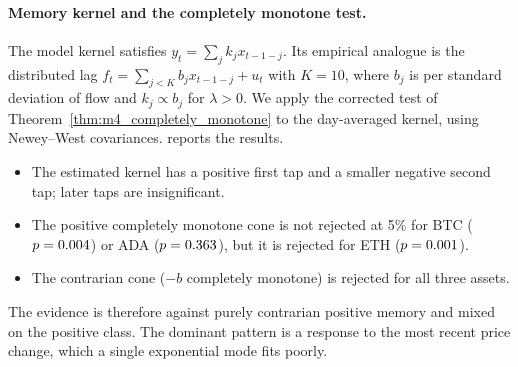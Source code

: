 \documentclass[10pt,twocolumn,letterpaper]{article}
\theoremstyle{definition}
\theoremstyle{remark}
\begin{document}
\begin{table}[htbp]\centering\scriptsize
\caption{Monte Carlo validation of the estimators on synthetic paths with known $Q$ (same EMA construction, $\Delta=10$\,s, $W=300$\,s; mean and standard deviation across replications).}
\label{tab:estimator_validation}

\end{table}

\begin{table}[htbp]\centering\scriptsize
\caption{Robustness of the flow response $\hat c$ (coefficient of $x_t$ in the $f_{t+1}$ equation) to additional flow lags. Day-level means; $t$ from day replicates.}
\label{tab:empirical_flowmemory}

\end{table}

\paragraph{Memory kernel and the completely monotone test.} The model kernel satisfies $y_t=\sum_jk_jx_{t-1-j}$. Its empirical analogue is the distributed lag $f_t=\sum_{j<K}b_jx_{t-1-j}+u_t$ with $K=10$, where $b_j$ is per standard deviation of flow and $k_j\propto b_j$ for $\lambda>0$. We apply the corrected test of Theorem~\ref{thm:m4_completely_monotone} to the day-averaged kernel, using Newey--West covariances.  reports the results.
\begin{itemize}
 \item The estimated kernel has a positive first tap and a smaller negative second tap; later taps are insignificant.
 \item The positive completely monotone cone is not rejected at 5\% for BTC ($p=0.004$) or ADA ($p=0.363$), but it is rejected for ETH ($p=0.001$).
 \item The contrarian cone ($-b$ completely monotone) is rejected for all three assets.
\end{itemize}
The evidence is therefore against purely contrarian positive memory and mixed on the positive class. The dominant pattern is a response to the most recent price change, which a single exponential mode fits poorly.

\begin{table}[htbp]\centering\scriptsize
\caption{Distributed-lag kernel (first five of ten taps; HAC standard errors in parentheses) and the vertex-calibrated completely monotone cone test (2{,}000 null draws).}
\label{tab:empirical_kernel}

\end{table}
\end{document}
